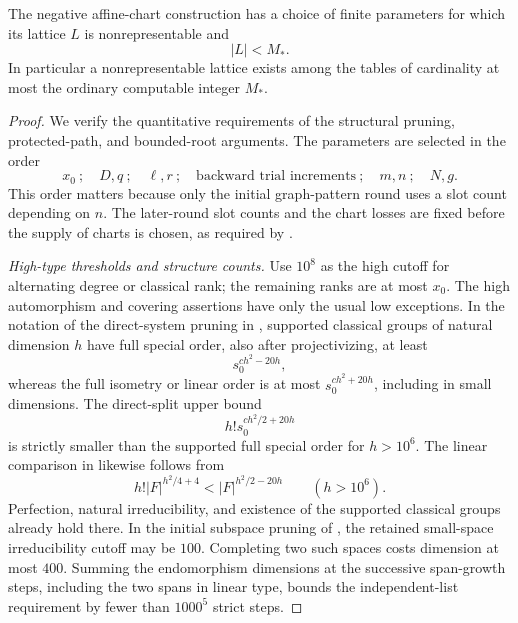 \begin{theorem}\label{q:size-ceiling}
The negative affine-chart construction has a choice of finite parameters
for which its lattice $L$ is nonrepresentable and
\[
                              |L|<M_*.
\]
In particular a nonrepresentable lattice exists among the tables of
cardinality at most the ordinary computable integer $M_*$.
\end{theorem}

\begin{proof}
We verify the quantitative requirements of the structural pruning,
protected-path, and bounded-root arguments.  The parameters are selected
in the order
\[
 x_0\ ;\quad D,q\ ;\quad \ell,r\ ;\quad
 \text{backward trial increments}\ ;\quad m,n\ ;\quad N,g.
\]
This order matters because only the initial graph-pattern round uses a
slot count depending on $n$.  The later-round slot counts and the chart
losses are fixed before the supply of charts is chosen, as required by
.

\emph{High-type thresholds and structure counts.}
Use $10^8$ as the high cutoff for alternating degree or classical rank;
the remaining ranks are at most $x_0$.  The high automorphism and covering
assertions have only the usual low exceptions.  In the notation of the
direct-system pruning in ,
supported classical groups of natural dimension $h$ have full special
order, also after projectivizing, at least
\[
                 s_0^{c h^2-20h},
\]
whereas the full isometry or linear order is at most
$s_0^{c h^2+20h}$, including in small dimensions.  The direct-split
upper bound
\[
                  h!s_0^{c h^2/2+20h}
\]
is strictly smaller than the supported full special order for $h>10^6$.
The linear comparison in  likewise follows from
\[
          h!|F|^{h^2/4+4}<|F|^{h^2/2-20h}
          \qquad(h>10^6).
\]
Perfection, natural irreducibility, and existence of the supported
classical groups already hold there.  In the initial subspace pruning of
, the retained small-space
irreducibility cutoff may be $100$.
Completing two such spaces costs dimension at most $400$.  Summing the
endomorphism dimensions at the successive span-growth steps, including
the two spans in linear type, bounds the independent-list requirement by
fewer than $1000^5$ strict steps.


\end{proof}
